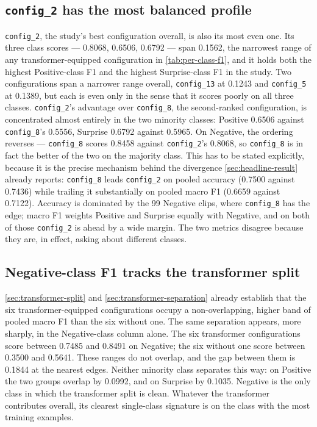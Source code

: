\subsection{\texttt{config\_2} has the most balanced profile}
\label{sec:config2-balanced}

\texttt{config\_2}, the study's best configuration overall, is also its most even one. Its three class scores --- 0.8068, 0.6506, 0.6792 --- span 0.1562, the narrowest range of any transformer-equipped configuration in \autoref{tab:per-class-f1}, and it holds both the highest Positive-class F1 and the highest Surprise-class F1 in the study. Two configurations span a narrower range overall, \texttt{config\_13} at 0.1243 and \texttt{config\_5} at 0.1389, but each is even only in the sense that it scores poorly on all three classes. \texttt{config\_2}'s advantage over \texttt{config\_8}, the second-ranked configuration, is concentrated almost entirely in the two minority classes: Positive 0.6506 against \texttt{config\_8}'s 0.5556, Surprise 0.6792 against 0.5965. On Negative, the ordering reverses --- \texttt{config\_8} scores 0.8458 against \texttt{config\_2}'s 0.8068, so \texttt{config\_8} is in fact the better of the two on the majority class. This has to be stated explicitly, because it is the precise mechanism behind the divergence \autoref{sec:headline-result} already reports: \texttt{config\_8} leads \texttt{config\_2} on pooled accuracy (0.7500 against 0.7436) while trailing it substantially on pooled macro F1 (0.6659 against 0.7122). Accuracy is dominated by the 99 Negative clips, where \texttt{config\_8} has the edge; macro F1 weights Positive and Surprise equally with Negative, and on both of those \texttt{config\_2} is ahead by a wide margin. The two metrics disagree because they are, in effect, asking about different classes.

\subsection{Negative-class F1 tracks the transformer split}
\label{sec:negative-tracks-split}

\autoref{sec:transformer-split} and \autoref{sec:transformer-separation} already establish that the six transformer-equipped configurations occupy a non-overlapping, higher band of pooled macro F1 than the six without one. The same separation appears, more sharply, in the Negative-class column alone. The six transformer configurations score between 0.7485 and 0.8491 on Negative; the six without one score between 0.3500 and 0.5641. These ranges do not overlap, and the gap between them is 0.1844 at the nearest edges. Neither minority class separates this way: on Positive the two groups overlap by 0.0992, and on Surprise by 0.1035. Negative is the only class in which the transformer split is clean. Whatever the transformer contributes overall, its clearest single-class signature is on the class with the most training examples.

